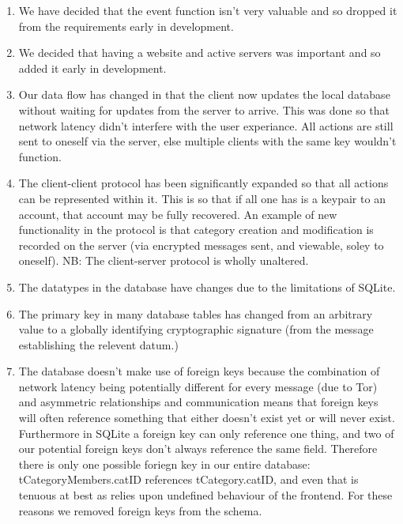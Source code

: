 \begin{enumerate}
\item We have decided that the event function isn't very valuable and so dropped it
from the requirements early in development.

\item We decided that having a website and active servers was important and so
added it early in development.

\item Our data flow has changed in that the client now updates the local
database without waiting for updates from the server to arrive. This was done so
that network latency didn't interfere with the user experiance. All actions are
still sent to oneself via the server, else multiple clients with the same key
wouldn't function.

\item The client-client protocol has been significantly expanded so that all
actions can be represented within it. This is so that if all one has is a
keypair to an account, that account may be fully recovered. An example of new
functionality in the protocol is that category creation and modification is
recorded on the server (via encrypted messages sent, and viewable, soley to
oneself). NB: The client-server protocol is wholly unaltered.

\item The datatypes in the database have changes due to the limitations of
SQLite.

\item The primary key in many database tables has changed from an arbitrary
value to a globally identifying cryptographic signature (from the message
establishing the relevent datum.)

\item The database doesn't make use of foreign keys because the combination of
network latency being potentially different for every message (due to Tor) and
asymmetric relationships and communication means that foreign keys will often
reference something that either doesn't exist yet or will never exist.
Furthermore in SQLite a foreign key can only reference one thing, and two of our
potential foreign keys don't always reference the same field. Therefore there is
only one possible foriegn key in our entire database: tCategoryMembers.catID
references tCategory.catID, and even that is tenuous at best as relies upon
undefined behaviour of the frontend. For these reasons we removed foreign keys
from the schema.


\end{enumerate}

